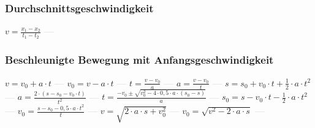 \subsubsection{Durchschnittsgeschwindigkeit} 
\begin{minipage}{0.45\textwidth} 
\end{minipage} 
\begin{minipage}{0.45\textwidth} 
 
\end{minipage} 
$ v = \frac{x_{1}  - x_{2} }{t_{1}  - t_{2} } $ \textcolor{lightgray}{\textbf{---}} 

\subsubsection{Beschleunigte Bewegung mit Anfangsgeschwindigkeit} 
\begin{minipage}{0.45\textwidth} 
\end{minipage} 
\begin{minipage}{0.45\textwidth} 
 
\end{minipage} 
$ v = v_{0}  + a\cdot t $ \textcolor{lightgray}{\textbf{---}} 
$ v_{0}  = v - a\cdot t $ \textcolor{lightgray}{\textbf{---}} 
$ t = \frac{v - v_{0} }{a} $ \textcolor{lightgray}{\textbf{---}} 
$ a = \frac{v - v_{0} }{  t} $ \textcolor{lightgray}{\textbf{---}} 
$ s = s_{0}  + v_{0} \cdot t + \frac{1}{2}\cdot a\cdot t^{2} $ \textcolor{lightgray}{\textbf{---}} 
$ a = \frac{2\cdot (s - s_{0}  - v_{0} \cdot t)}{     t^{2} } $ \textcolor{lightgray}{\textbf{---}} 
$ t = \frac{-v_{0}  \pm \sqrt{v_{0} ^{2} -4\cdot 0,5\cdot a\cdot (s_{0}  -s)}}{       a} $ \textcolor{lightgray}{\textbf{---}} 
$ s_{0}  = s - v_{0} \cdot t - \frac{1}{2}\cdot a\cdot t^{2} $ \textcolor{lightgray}{\textbf{---}} 
$ v_{0}  =\frac{s-s_{0} -0,5\cdot a\cdot t^{2} }{    t} $ \textcolor{lightgray}{\textbf{---}} 
$ v  =\sqrt{2\cdot a \cdot s+ v_{0}^2} $ \textcolor{lightgray}{\textbf{---}} 
$ v_{0}  =\sqrt{v^2-2\cdot a \cdot s} $ \textcolor{lightgray}{\textbf{---}} 


